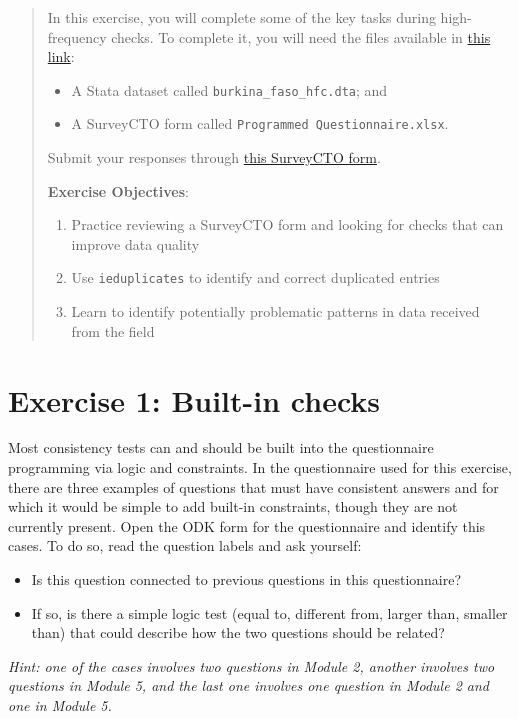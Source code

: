 \documentclass{tufte-handout}
\begin{document}
\begin{abstract}
In this exercise, you will complete some of the key tasks during high-frequency checks. To complete it, you will need the files available in \textcolor{blue}{\href{https://osf.io/uv8d5/}{this link}}:
\begin{itemize}
	\item A Stata dataset called \texttt{burkina\_faso\_hfc.dta}; and
	\item A SurveyCTO form called \texttt{Programmed Questionnaire.xlsx}.
\end{itemize}

Submit your responses through \textcolor{blue}{\href{https://survey.wb.surveycto.com/collect/hfc?caseid=}{this SurveyCTO form}}.

\bigskip\noindent \textbf{Exercise Objectives}:
\begin{enumerate}
  \item Practice reviewing a SurveyCTO form and looking for checks that can improve data quality
  \item Use \texttt{ieduplicates} to identify and correct duplicated entries 
  \item Learn to identify potentially problematic patterns in data received from the field
\end{enumerate}
\end{abstract}

\section{Exercise 1: Built-in checks}
Most consistency tests can and should be built into the questionnaire programming via logic and constraints. In the questionnaire used for this exercise, there are three examples of questions that must have consistent answers and for which it would be simple to add built-in constraints, though they are not currently present. Open the ODK form for the questionnaire and identify this cases. To do so, read the question labels and ask yourself: 
\begin{itemize}
	\item Is this question connected to previous questions in this questionnaire? 
	\item If so, is there a simple logic test (equal to, different from, larger than, smaller than) that could describe how the two questions should be related?
\end{itemize}
\textit{Hint: one of the cases involves two questions in Module 2, another involves two questions in Module 5, and the last one involves one question in Module 2 and one in Module 5.}
\end{document}
